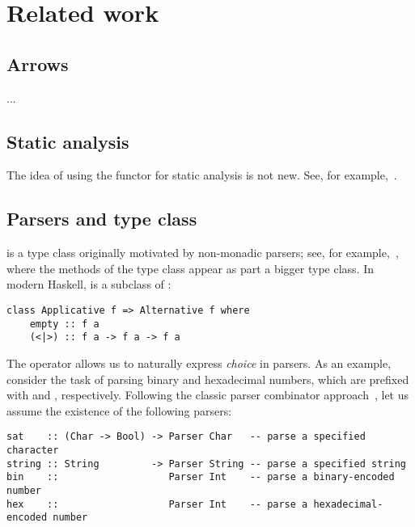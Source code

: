 \section{Related work}\label{sec-related}

\subsection{Arrows}

...

\subsection{Static analysis}

The idea of using the  functor for static analysis is not new.
See, for example,~\citet{free-applicatives}.

\subsection{Parsers and  type class}

 is a type class originally motivated by non-monadic parsers;
see, for example,~\citet{swierstra1996parsers}, where the methods of the
 type class appear as part a bigger  type class. In
modern Haskell,  is a subclass of :

\vspace{1mm}
\begin{verbatim}
class Applicative f => Alternative f where
    empty :: f a
    (<|>) :: f a -> f a -> f a
\end{verbatim}
\vspace{1mm}

\noindent
The operator \hs{<|>} allows us to naturally express \emph{choice} in parsers.
As an example, consider the task of parsing binary and hexadecimal numbers,
which are prefixed with  and , respectively. Following the
classic parser combinator approach~\citep{hutton1998monadic}, let us assume the
existence of the following parsers:

\vspace{1mm}
\begin{verbatim}
sat    :: (Char -> Bool) -> Parser Char   -- parse a specified character
string :: String         -> Parser String -- parse a specified string
bin    ::                   Parser Int    -- parse a binary-encoded number
hex    ::                   Parser Int    -- parse a hexadecimal-encoded number
\end{verbatim}
\vspace{1mm}

